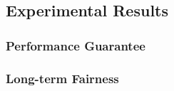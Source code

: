 \subsection{Experimental Results}

\subsubsection{Performance Guarantee}

\subsubsection{Long-term Fairness}